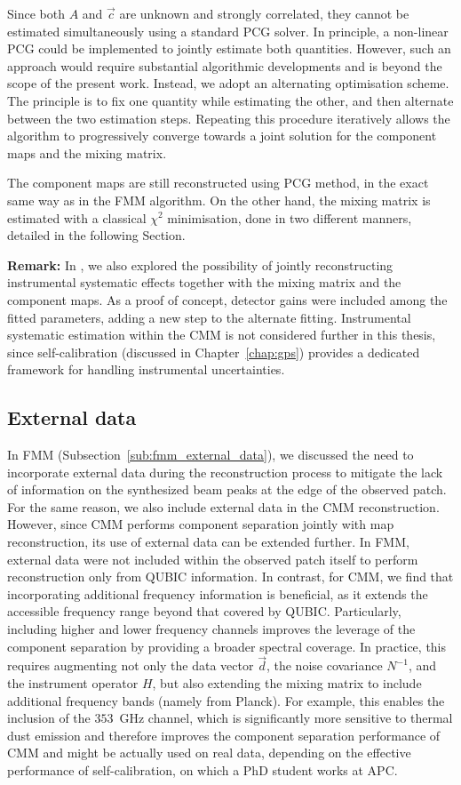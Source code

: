 \documentclass[../../thesis.tex]{subfiles}
\begin{document}
Since both $A$ and $\vec{c}$ are unknown and strongly correlated, they cannot be estimated simultaneously using a standard PCG solver. In principle, a non-linear PCG could be implemented to jointly estimate both quantities. However, such an approach would require substantial algorithmic developments and is beyond the scope of the present work. Instead, we adopt an alternating optimisation scheme. The principle is to fix one quantity while estimating the other, and then alternate between the two estimation steps. Repeating this procedure iteratively allows the algorithm to progressively converge towards a joint solution for the component maps and the mixing matrix.

The component maps are still reconstructed using PCG method, in the exact same way as in the FMM algorithm. On the other hand, the mixing matrix is estimated with a classical $\chi^2$ minimisation, done in two different manners, detailed in the following Section.

\noindent
\textbf{Remark:} In \cite{CMM}, we also explored the possibility of jointly reconstructing instrumental systematic effects together with the mixing matrix and the component maps. As a proof of concept, detector gains were included among the fitted parameters, adding a new step to the alternate fitting. Instrumental systematic estimation within the CMM is not considered further in this thesis, since self-calibration (discussed in Chapter~\ref{chap:gps}) provides a dedicated framework for handling instrumental uncertainties. 

\subsection{External data} \label{sub:cmm_external_data}

In FMM (Subsection~\ref{sub:fmm_external_data}), we discussed the need to incorporate external data during the reconstruction process to mitigate the lack of information on the synthesized beam peaks at the edge of the observed patch. For the same reason, we also include external data in the CMM reconstruction.
However, since CMM performs component separation jointly with map reconstruction, its use of external data can be extended further. In FMM, external data were not included within the observed patch itself to perform reconstruction only from QUBIC information. In contrast, for CMM, we find that incorporating additional frequency information is beneficial, as it extends the accessible frequency range beyond that covered by QUBIC. Particularly, including higher and lower frequency channels improves the leverage of the component separation by providing a broader spectral coverage.
In practice, this requires augmenting not only the data vector $\vec{d}$, the noise covariance $N^{-1}$, and the instrument operator $H$, but also extending the mixing matrix to include additional frequency bands (namely from Planck). For example, this enables the inclusion of the $353$~GHz channel, which is significantly more sensitive to thermal dust emission and therefore improves the component separation performance of CMM and might be actually used on real data, depending on the effective performance of self-calibration, on which a PhD student works at APC.
\end{document}
